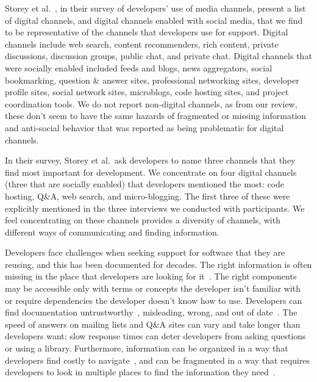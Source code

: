 Storey et al.~\cite{storey_revolution_2014}, in their survey of developers' use of media channels, present a list of digital channels, and digital channels enabled with social media, that we find to be representative of the channels that developers use for support.
Digital channels include web search, content recommenders, rich content, private discussions, discussion groups, public chat, and private chat.
Digital channels that were socially enabled included feeds and blogs, news aggregators, social bookmarking, question \& answer sites, professional networking sites, developer profile sites, social network sites, microblogs, code hosting sites, and project coordination tools.
We do not report non-digital channels, as from our review, these don't seem to have the same hazards of fragmented or missing information and anti-social behavior that was reported as being problematic for digital channels.

In their survey, Storey et al.\ ask developers to name three channels that they find most important for development.
We concentrate on four digital channels (three that are socially enabled) that developers mentioned the most: code hosting, Q\&A, web search, and micro-blogging.
The first three of these were explicitly mentioned in the three interviews we conducted with participants.
We feel concentrating on these channels provides a diversity of channels, with different ways of communicating and finding information.

Developers face challenges when seeking support for software that they are reusing, and this has been documented for decades.
The right information is often missing in the place that developers are looking for it~\cite{robillard_field_2011,storey_revolution_2014,nykaza_what_2002}.
The right components may be accessible only with terms or concepts the developer isn't familiar with~\cite{nykaza_what_2002,jeong_improving_2009,robillard_field_2011} or require dependencies the developer doesn't know how to use.
Developers can find documentation untrustworthy~\cite{robillard_field_2011,storey_revolution_2014}, misleading, wrong, and out of date~\cite{nykaza_what_2002,lethbridge_how_2003,robillard_field_2011}.
The speed of answers on mailing lists and Q\&A sites can vary and take longer than developers want; slow response times can deter developers from asking questions or using a library.
Furthermore, information can be organized in a way that developers find costly to navigate~\cite{robillard_field_2011}, and can be fragmented in a way that requires developers to look in multiple places to find the information they need~\cite{jeong_improving_2009}.

